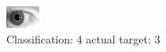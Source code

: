 \begin{figure}[h!]
\begin{center}
\includegraphics[width=0.60\columnwidth]{figures/ID322_class_4_target_3.png}
\end{center}
\caption{ Classification: 4 actual target: 3}
\label{fig:ID322_class_4_target_3}
\end{figure}
